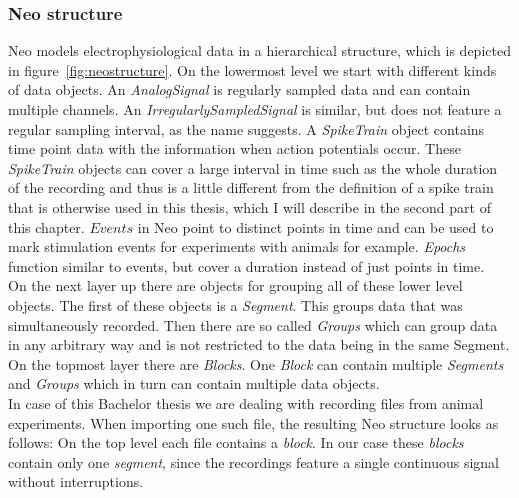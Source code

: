 \subsubsection{Neo structure}
Neo models electrophysiological data in a hierarchical structure, which is depicted in figure~\ref{fig:neostructure}. On the lowermost level we start with different kinds of data objects. An \textit{AnalogSignal} is regularly sampled data and can contain multiple channels. An \textit{IrregularlySampledSignal} is similar, but does not feature a regular sampling interval, as the name suggests. A \textit{SpikeTrain} object contains time point data with the information when action potentials occur. These \textit{SpikeTrain} objects can cover a large interval in time such as the whole duration of the recording and thus is a little different from the definition of a spike train that is otherwise used in this thesis, which I will describe in the second part of this chapter. 
$Events$ in Neo point to distinct points in time and can be used to mark stimulation events for experiments with animals for example. \textit{Epochs} function similar to events, but cover a duration instead of just points in time.\\
On the next layer up there are objects for grouping all of these lower level objects. The first of these objects is a \textit{Segment}. This groups data that was simultaneously recorded. Then there are so called \textit{Groups} which can group data in any arbitrary way and is not restricted to the data being in the same Segment. On the topmost layer there are \textit{Blocks}. One \textit{Block} can contain multiple \textit{Segments} and \textit{Groups} which in turn can contain multiple data objects.\\

In case of this Bachelor thesis we are dealing with recording files from animal experiments. When importing one such file, the resulting Neo structure looks as follows: On the top level each file contains a \textit{block}. In our case these \textit{blocks} contain only one \textit{segment}, since the recordings feature a single continuous signal without interruptions.

